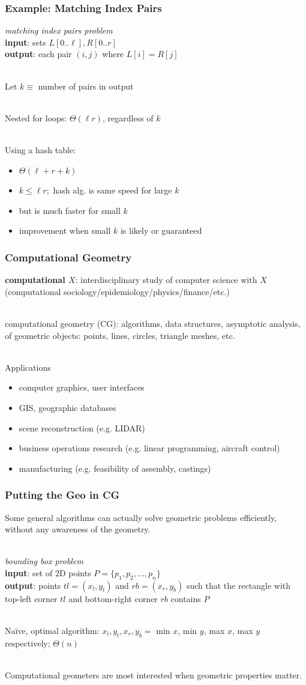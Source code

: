 \documentclass{beamer}
\newcommand{\stanza}{ \\~\ }
\begin{document}
\begin{frame} \frametitle{Example: Matching Index Pairs}
\emph{matching index pairs problem} \\
\textbf{input}: sets $L[0..\ell], R[0..r]$ \\
\textbf{output}: each pair $(i, j)$ where $L[i]=R[j]$ \stanza

Let $k \equiv$ number of pairs in output \stanza

Nested for loops: $\Theta(\ell r)$, regardless of $k$ \stanza

Using a hash table:
\begin{itemize}
  \item $\Theta(\ell + r + k)$
  \item $k \leq \ell r;$ hash alg. is same speed for large $k$
  \item but is much faster for small $k$
  \item improvement when small $k$ is likely or guaranteed
\end{itemize}
\end{frame}

\begin{frame} \frametitle{Computational Geometry}
\textbf{computational $X$}: interdisciplinary study of computer science with $X$ \\
(computational sociology/epidemiology/physics/finance/etc.) \stanza

computational geometry (CG): algorithms, data structures, asymptotic analysis, of
geometric objects: points, lines, circles, triangle meshes, etc. \stanza

Applications
\begin{itemize}
  \item computer graphics, user interfaces
  \item GIS, geographic databases
  \item scene reconstruction (e.g. LIDAR)
  \item business operations research (e.g. linear programming, aircraft control)
  \item manufacturing (e.g. feasibility of assembly, castings)
\end{itemize}
\end{frame}

\begin{frame} \frametitle{Putting the Geo in CG}
Some general algorithms can actually solve geometric problems efficiently, without
any awareness of the geometry. \stanza

\emph{bounding box problem} \\
\textbf{input}: set of 2D points $P=\{p_1, p_2, \ldots, p_n\}$ \\
\textbf{output}: points $tl=(x_l, y_t)$ and $rb=(x_r, y_b)$ such that the rectangle
with top-left corner $tl$ and bottom-right corner $rb$ contains $P$ \stanza

Na\"{i}ve, optimal algorithm: $x_l, y_t, x_r, y_b = $ min $x$, min $y$, max $x$,
max $y$ respectively; $\Theta(n)$ \stanza

Computational geometers are most interested when geometric properties matter.
\end{frame}
\end{document}
